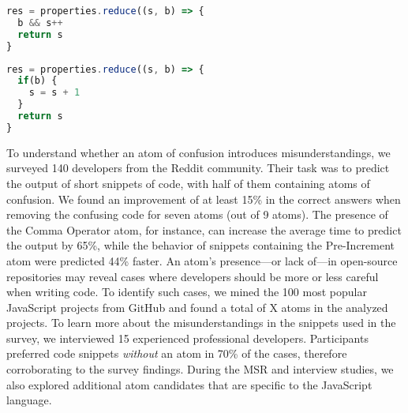 \begin{figure*}[thb]
\noindent\begin{minipage}{.45\textwidth}  
\begin{lstlisting}[language=JavaScript]
res = properties.reduce((s, b) => {
  b && s++
  return s
}
\end{lstlisting}
\end{minipage}\hfill
\begin{minipage}{.45\textwidth}
\begin{lstlisting}[language=JavaScript]
res = properties.reduce((s, b) => {
  if(b) {
    s = s + 1
  }
  return s
}
\end{lstlisting}
\end{minipage}
\label{fig:lst01}
\end{figure*}

To understand whether an atom of confusion introduces misunderstandings, we surveyed 140 developers from the Reddit community. Their task was to predict the output of short snippets of code, with half of them containing atoms of confusion. We found an improvement of at least 15\% in the correct answers when removing the confusing code for seven atoms (out of 9 atoms). The presence of the Comma Operator atom, for instance, can increase the average time to predict the output by 65\%, while the behavior of snippets containing the Pre-Increment atom were predicted 44\% faster.  An atom's presence---or lack of---in open-source repositories may reveal cases where developers should be more or less careful when writing code. To identify such cases, we mined the 100 most popular JavaScript projects from GitHub and found a total of X atoms in the analyzed projects. To learn more about the misunderstandings in the snippets used in the survey, we interviewed 15 experienced professional developers. Participants preferred code snippets \textit{without} an atom in 70\% of the cases, therefore corroborating to the survey findings. During the MSR and interview studies, we also explored additional atom candidates that are specific to the
JavaScript language. 


